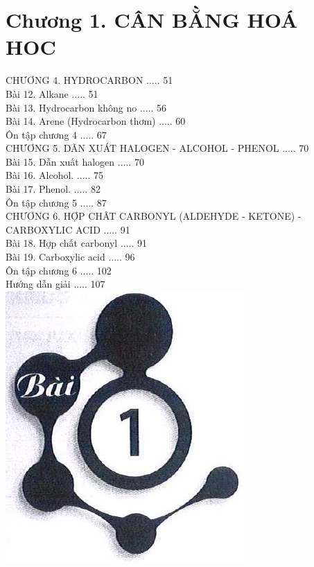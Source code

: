 \documentclass[10pt]{article}
\begin{document}
\captionsetup{singlelinecheck=false}
\section*{Chương 1. CÂN BẰNG HOÁ HOC}
CHƯƠNG 4. HYDROCARBON ..... 51\\
Bài 12. Alkane ..... 51\\
Bài 13. Hydrocarbon không no ..... 56\\
Bài 14. Arene (Hydrocarbon thơm) ..... 60\\
Ôn tập chương 4 ..... 67\\
CHƯƠNG 5. DÃN XUÁT HALOGEN - ALCOHOL - PHENOL ..... 70\\
Bài 15. Dẫn xuất halogen ..... 70\\
Bài 16. Alcohol. ..... 75\\
Bài 17. Phenol. ..... 82\\
Ôn tập chương 5 ..... 87\\
CHƯƠNG 6. HỢP CHÂT CARBONYL (ALDEHYDE - KETONE) - CARBOXYLIC ACID ..... 91\\
Bài 18. Hợp chất carbonyl ..... 91\\
Bài 19. Carboxylic acid ..... 96\\
Ôn tập chương 6 ..... 102\\
Hướng dẫn giải ..... 107\\
\includegraphics[max width=\textwidth, center]{2025_10_23_ae7aef68fb3b41082d29g-01}
\end{document}
